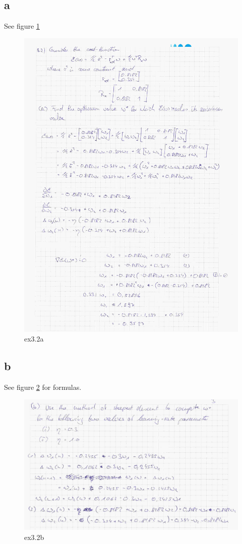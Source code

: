 \documentclass[paper=a4, fontsize=11pt]{scrartcl} %
\numberwithin{equation}{section} %
\numberwithin{figure}{section} %
\numberwithin{table}{section} %
\begin{document}
\subsection{a}
See figure \ref{fig3_2a}
\begin{figure}[ht]
	\centering
  \includegraphics[width=0.7\textheight]{ex3_2a.jpg}
	\caption{ex3.2a}
	\label{fig3_2a}
\end{figure}

\subsection{b}
See figure \ref{fig3_2b} for formulas.
\begin{figure}[ht]
	\centering
  \includegraphics[width=0.7\textheight]{ex3_2b.jpg}
	\caption{ex3.2b}
	\label{fig3_2b}
\end{figure}
\end{document}
